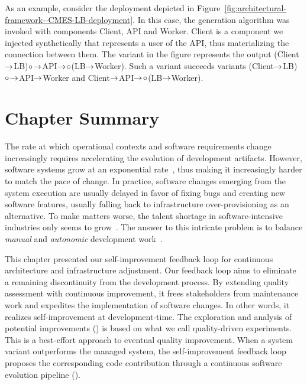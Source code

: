 As an example, consider the deployment depicted in Figure~\ref{fig:architectural-framework--CMES-LB-deployment}. In this case, the generation algorithm was invoked with components Client, API and Worker. Client is a component we injected synthetically that represents a user of the API, thus materializing the connection between them. The variant in the figure represents the output \mbox{(Client$\rightarrow$LB)$\circ\!\rightarrow$API$\rightarrow\!\circ$(LB$\rightarrow$Worker)}. Such a variant succeeds variants \mbox{(Client$\rightarrow$LB)$\circ\!\rightarrow$API$\rightarrow$Worker} and \mbox{Client$\rightarrow$API$\rightarrow\!\circ$(LB$\rightarrow$Worker)}.


\section{Chapter Summary}

The rate at which operational contexts and software requirements change increasingly requires accelerating the evolution of development artifacts. However, software systems grow at an exponential rate~\cite{van-genuchten-2012-compound,hatton-2017-long}, thus making it increasingly harder to match the pace of change. In practice, software changes emerging from the system execution are usually delayed in favor of fixing bugs and creating new software features, usually falling back to infrastructure over-provisioning as an alternative. To make matters worse, the talent shortage in software-intensive industries only seems to grow~\cite{radant-2014-analysis,breaux-2021-software}. The answer to this intricate problem is to balance \emph{manual} and \emph{autonomic} development work~\cite{bosch-2016-data}.

This chapter presented our self-improvement feedback loop for continuous architecture and infrastructure adjustment. Our feedback loop aims to eliminate a remaining discontinuity from the development process. By extending quality assessment with continuous improvement, it frees stakeholders from maintenance work and expedites the implementation of software changes. In other words, it realizes self-improvement at development-time. The exploration and analysis of potential improvements () is based on what we call quality-driven experiments. This is a best-effort approach to eventual quality improvement. When a system variant outperforms the managed system, the self-improvement feedback loop proposes the corresponding code contribution through a continuous software evolution pipeline ().

